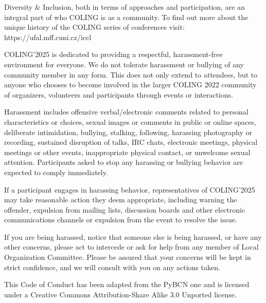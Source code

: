 Diversity & Inclusion, both in terms of approaches and participation, are an integral part of who COLING is as a community. To find out more about the unique history of the COLING series of conferences visit: https://ufal.mff.cuni.cz/iccl

COLING’2025 is dedicated to providing a respectful, harassment-free environment for everyone. We do not tolerate harassment or bullying of any community member in any form. This does not only extend to attendees, but to anyone who chooses to become involved in the larger COLING 2022 community of organizers, volunteers and participants through events or interactions.

Harassment includes offensive verbal/electronic comments related to personal characteristics or choices, sexual images or comments in public or online spaces, deliberate intimidation, bullying, stalking, following, harassing photography or recording, sustained disruption of talks, IRC chats, electronic meetings, physical meetings or other events, inappropriate physical contact, or unwelcome sexual attention. Participants asked to stop any harassing or bullying behavior are expected to comply immediately.

If a participant engages in harassing behavior, representatives of COLING’2025 may take reasonable action they deem appropriate, including warning the offender, expulsion from mailing lists, discussion boards and other electronic communications channels or expulsion from the event to resolve the issue.

If you are being harassed, notice that someone else is being harassed, or have any other concerns, please act to intercede or ask for help from any member of Local Organization Committee. Please be assured that your concerns will be kept in strict confidence, and we will consult with you on any actions taken.

This Code of Conduct has been adapted from the PyBCN one and is licensed under a Creative Commons Attribution-Share Alike 3.0 Unported license.